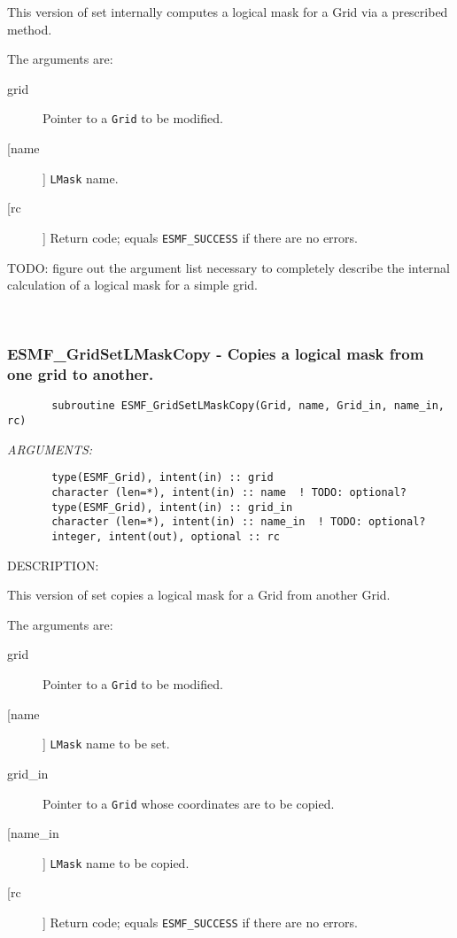 {       This version of set internally computes a logical mask for a Grid via a
       prescribed method.
  
       The arguments are:
       \begin{description}
       \item[grid] 
            Pointer to a {\tt Grid} to be modified.
       \item [[name]]
             {\tt LMask} name.
       \item[[rc]] 
            Return code; equals {\tt ESMF\_SUCCESS} if there are no errors.
       \end{description}
  
  TODO: figure out the argument list necessary to completely describe the 
        internal calculation of a logical mask for a simple grid. 
 
\mbox{}\hrulefill\ 
 
\subsubsection{ESMF\_GridSetLMaskCopy - Copies a logical mask from one grid to another.}


 
\begin{verbatim}       subroutine ESMF_GridSetLMaskCopy(Grid, name, Grid_in, name_in, rc)\end{verbatim}{\em ARGUMENTS:}
\begin{verbatim}       type(ESMF_Grid), intent(in) :: grid
       character (len=*), intent(in) :: name  ! TODO: optional?
       type(ESMF_Grid), intent(in) :: grid_in
       character (len=*), intent(in) :: name_in  ! TODO: optional?
       integer, intent(out), optional :: rc            \end{verbatim}
{\sf DESCRIPTION:\\ }


       This version of set copies a logical mask for a Grid from another Grid.
  
       The arguments are:
       \begin{description}
       \item[grid] 
            Pointer to a {\tt Grid} to be modified.
       \item [[name]]
             {\tt LMask} name to be set.
       \item[grid\_in] 
            Pointer to a {\tt Grid} whose coordinates are to be copied.
       \item [[name\_in]]
             {\tt LMask} name to be copied.
       \item[[rc]] 
            Return code; equals {\tt ESMF\_SUCCESS} if there are no errors.
       \end{description}
   
}
